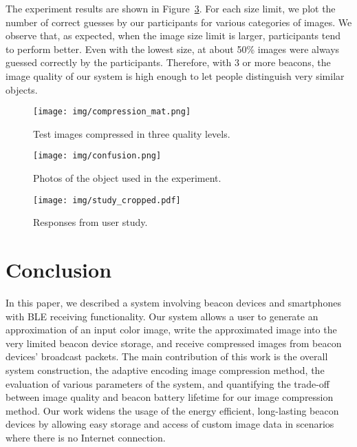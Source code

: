 
The experiment results are shown in Figure~\ref{fig:confusion2}. For each size limit, we plot the number of correct guesses by our participants for various categories of images. We observe that, as expected, when the image size limit is larger, participants tend to perform better. Even with the lowest size, at about 50\% images were always guessed correctly by the participants. Therefore, with 3 or more beacons, the image quality of our system is high enough to let people distinguish very similar objects.

\begin{figure}[!htb]
	\begin{center}
		\texttt{[image: img/compression\_mat.png]}
		\caption{Test images compressed in three quality levels.}
		\label{fig:compression_mat}
	\end{center}
	\vspace{-1.5em}
\end{figure}

\begin{figure}[!htb]
	\begin{center}
		\texttt{[image: img/confusion.png]}
		\caption{Photos of the object used in the experiment.}
		\label{fig:confusion}
	\end{center}
	\vspace{-1.5em}
\end{figure}


\begin{figure}[!htb]
	\begin{center}
		\texttt{[image: img/study\_cropped.pdf]}
		\caption{Responses from user study.}
		\label{fig:confusion2}
	\end{center}
	\vspace{-1.5em}
\end{figure}
\section{Conclusion}
\label{sec:conclusion}
In this paper, we described a system involving beacon devices and smartphones with BLE receiving functionality. Our system allows a user to generate an approximation of an input color image, write the approximated image into the very limited beacon device storage, and receive compressed images from beacon devices' broadcast packets. The main contribution of this work is the overall system construction, the adaptive encoding image compression method, the evaluation of various parameters of the system, and quantifying the trade-off between image quality and beacon battery lifetime for our image compression method. Our work widens the usage of the energy efficient, long-lasting beacon devices by allowing easy storage and access of custom image data in scenarios where there is no Internet connection.


